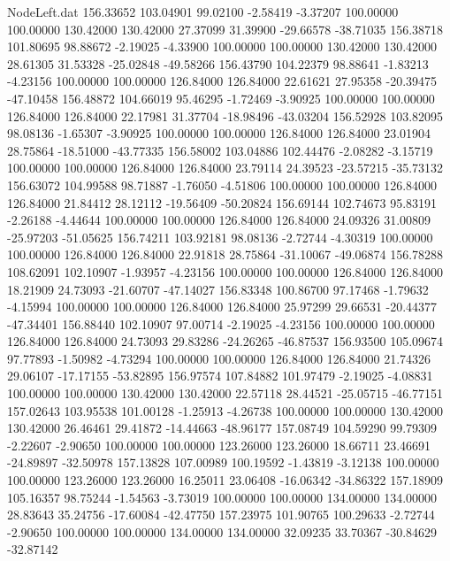 \begin{filecontents}{NodeLeft.dat}
 156.33652  103.04901   99.02100    -2.58419   -3.37207  100.00000  100.00000  130.42000  130.42000   27.37099   31.39900  -29.66578  -38.71035
 156.38718  101.80695   98.88672    -2.19025   -4.33900  100.00000  100.00000  130.42000  130.42000   28.61305   31.53328  -25.02848  -49.58266
 156.43790  104.22379   98.88641    -1.83213   -4.23156  100.00000  100.00000  126.84000  126.84000   22.61621   27.95358  -20.39475  -47.10458
 156.48872  104.66019   95.46295    -1.72469   -3.90925  100.00000  100.00000  126.84000  126.84000   22.17981   31.37704  -18.98496  -43.03204
 156.52928  103.82095   98.08136    -1.65307   -3.90925  100.00000  100.00000  126.84000  126.84000   23.01904   28.75864  -18.51000  -43.77335
 156.58002  103.04886  102.44476    -2.08282   -3.15719  100.00000  100.00000  126.84000  126.84000   23.79114   24.39523  -23.57215  -35.73132
 156.63072  104.99588   98.71887    -1.76050   -4.51806  100.00000  100.00000  126.84000  126.84000   21.84412   28.12112  -19.56409  -50.20824
 156.69144  102.74673   95.83191    -2.26188   -4.44644  100.00000  100.00000  126.84000  126.84000   24.09326   31.00809  -25.97203  -51.05625
 156.74211  103.92181   98.08136    -2.72744   -4.30319  100.00000  100.00000  126.84000  126.84000   22.91818   28.75864  -31.10067  -49.06874
 156.78288  108.62091  102.10907    -1.93957   -4.23156  100.00000  100.00000  126.84000  126.84000   18.21909   24.73093  -21.60707  -47.14027
 156.83348  100.86700   97.17468    -1.79632   -4.15994  100.00000  100.00000  126.84000  126.84000   25.97299   29.66531  -20.44377  -47.34401
 156.88440  102.10907   97.00714    -2.19025   -4.23156  100.00000  100.00000  126.84000  126.84000   24.73093   29.83286  -24.26265  -46.87537
 156.93500  105.09674   97.77893    -1.50982   -4.73294  100.00000  100.00000  126.84000  126.84000   21.74326   29.06107  -17.17155  -53.82895
 156.97574  107.84882  101.97479    -2.19025   -4.08831  100.00000  100.00000  130.42000  130.42000   22.57118   28.44521  -25.05715  -46.77151
 157.02643  103.95538  101.00128    -1.25913   -4.26738  100.00000  100.00000  130.42000  130.42000   26.46461   29.41872  -14.44663  -48.96177
 157.08749  104.59290   99.79309    -2.22607   -2.90650  100.00000  100.00000  123.26000  123.26000   18.66711   23.46691  -24.89897  -32.50978
 157.13828  107.00989  100.19592    -1.43819   -3.12138  100.00000  100.00000  123.26000  123.26000   16.25011   23.06408  -16.06342  -34.86322
 157.18909  105.16357   98.75244    -1.54563   -3.73019  100.00000  100.00000  134.00000  134.00000   28.83643   35.24756  -17.60084  -42.47750
 157.23975  101.90765  100.29633    -2.72744   -2.90650  100.00000  100.00000  134.00000  134.00000   32.09235   33.70367  -30.84629  -32.87142

\end{filecontents}

